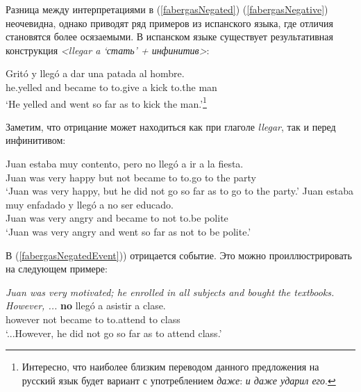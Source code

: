 \documentclass[a4paper, titlepage]{article}
\begin{document}
Разница между интерпретациями в (\ref{fabergasNegated}) (\ref{fabergasNegative}) неочевидна, однако \citep{fabergas2017building} приводят ряд примеров из испанского языка, где отличия становятся более осязаемыми. В испанском языке существует результативная конструкция \textit{<llegar a `стать' + инфинитив>}:

\medskip

\begin{exe}
    \ex \gll Gritó y llegó a dar una patada al hombre. \\
        he.yelled and became to to.give a kick to.the man \\
    \glt `He yelled and went so far as to kick the man.'\footnote{Интересно, что наиболее близким переводом данного предложения на русский язык будет вариант с употреблением \textit{даже}: \textit{и даже ударил его}.}
\end{exe}

Заметим, что отрицание может находиться как при глаголе \textit{llegar}, так и перед инфинитивом:

\begin{exe}
    \ex \begin{xlist}
        \ex \label{fabergasNegatedEvent} \gll Juan estaba muy contento, pero no llegó a ir a la fiesta. \\
            Juan was very happy but not became to to.go to the party \\
            \glt `Juan was very happy, but he did not go so far as to go to the party.'
        \ex \gll Juan estaba muy enfadado y llegó a no ser educado. \\
            Juan was very angry and became to not to.be polite \\
            \glt `Juan was very angry and went so far as not to be polite.'
    \end{xlist}
\end{exe}

В (\ref{fabergasNegatedEvent})) отрицается событие. Это можно проиллюстрировать на следующем примере:

\begin{exe}
    \ex \label{fabergasScaleReversal} {\small \textit{Juan was very motivated; he enrolled in all subjects and bought the textbooks. However, ...}}
         \textbf{no} llegó a asistir a clase. \\
             however not became to to.attend to class \\
        \glt `...However, he did not go so far as to attend class.'
\end{exe}
\end{document}
